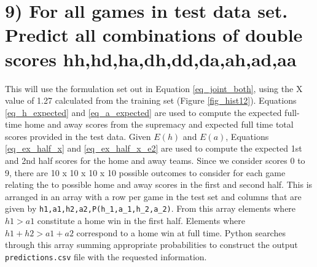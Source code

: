 \documentclass[10pt]{article}
\begin{document}
\section{9) For all games in test data set. Predict all combinations of double scores hh,hd,ha,dh,dd,da,ah,ad,aa}
\label{sec_9}

This will use the formulation set out in Equation \ref{eq_joint_both}, using the X value of 1.27 calculated from the training set (Figure \ref{fig_hist12}). Equations \ref{eq_h_expected} and \ref{eq_a_expected} are used to compute the expected full-time home and away scores from the supremacy and expected full time total scores provided in the test data. Given $E(h)$ and $E(a)$, Equations \ref{eq_ex_half_x} and \ref{eq_ex_half_x_e2} are used to compute the expected 1st and 2nd half scores for the home and away teams. Since we consider scores 0 to 9, there are 10 x 10 x 10 x 10 possible outcomes to consider for each game relating the to possible home and away scores in the first and second half. This is arranged in an array with a row per game in the test set and columns that are given by \verb|h1,a1,h2,a2,P(h_1,a_1,h_2,a_2)|. From this array elements where $h1>a1$ constitute a home win in the first half. Elements where $h1+h2>a1+a2$ correspond to a home win at full time. Python searches through this array summing appropriate probabilities to construct the output \verb|predictions.csv| file with the requested information.
\end{document}
